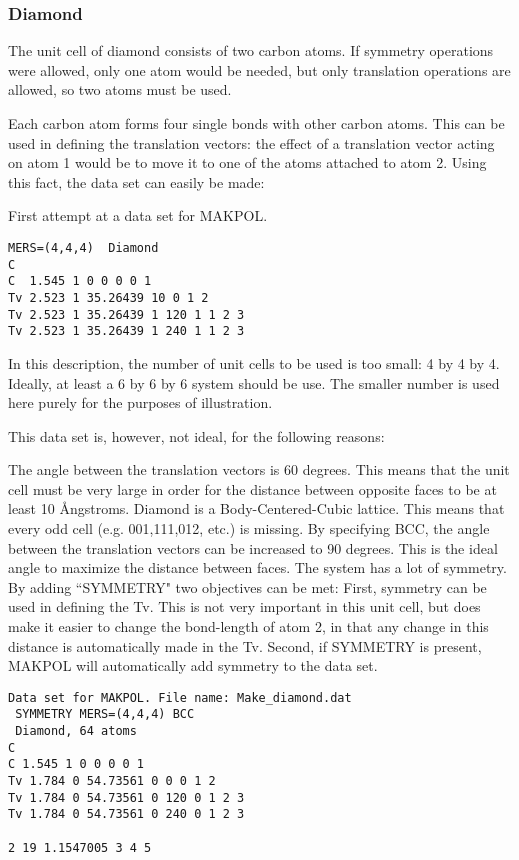 \subsubsection{Diamond}

The unit cell of diamond consists of two carbon atoms. If symmetry operations were allowed,
 only one atom would be needed, but only translation operations are allowed, so two atoms
 must be used.

Each carbon atom forms four single bonds with other carbon atoms. 
This can be used in defining the translation vectors: the effect 
of a translation vector acting on atom 1 would be to move it to 
one of the atoms attached to atom 2. 
 Using this fact, the data set can easily be made:

First attempt at a data set for MAKPOL. \begin{verbatim}
MERS=(4,4,4)  Diamond
C
C  1.545 1 0 0 0 0 1
Tv 2.523 1 35.26439 10 0 1 2
Tv 2.523 1 35.26439 1 120 1 1 2 3
Tv 2.523 1 35.26439 1 240 1 1 2 3
\end{verbatim}

In this description, the number of unit cells to be used is too
small: 4 by 4 by 4.  Ideally, at least a 6 by 6 by 6 system
 should be use. The smaller number is used here purely for the
 purposes of illustration.



This data set is, however, not ideal, for the following reasons:

The angle between the translation vectors is 60 degrees. This 
means that the unit cell must be very large in order for the 
distance between opposite faces to be at least 10 \AA ngstroms. 
Diamond is a Body-Centered-Cubic lattice. This means that every 
odd cell (e.g. 001,111,012, etc.) is missing. By specifying BCC, 
the angle between the translation vectors can be increased to 90 
degrees. This is the ideal angle to maximize the distance between 
faces. The system has a lot of symmetry. By adding ``SYMMETRY" two 
objectives can be met: First, symmetry can be used in defining the 
Tv. This is not very important in this unit cell, but does make it 
easier to change the bond-length of atom 2, in that any change in 
this distance is automatically made in the Tv. Second, if SYMMETRY 
is present, MAKPOL will automatically add symmetry to the data 
set.

\begin{verbatim}
Data set for MAKPOL. File name: Make_diamond.dat
 SYMMETRY MERS=(4,4,4) BCC
 Diamond, 64 atoms 
C 
C 1.545 1 0 0 0 0 1 
Tv 1.784 0 54.73561 0 0 0 1 2 
Tv 1.784 0 54.73561 0 120 0 1 2 3 
Tv 1.784 0 54.73561 0 240 0 1 2 3 

2 19 1.1547005 3 4 5 
\end{verbatim}

